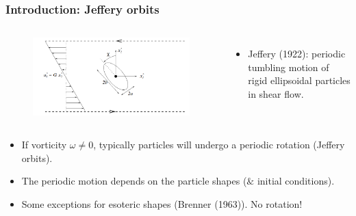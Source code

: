\documentclass{beamer}
\newcommand{\bi}{\begin{itemize}}
\newcommand{\ei}{\end{itemize}}
\begin{document}
\begin{frame}
	\frametitle{Introduction: Jeffery orbits}
	\begin{overlayarea}{\textwidth}{\textheight}
		\vspace{-0.2cm}
		\begin{columns}
			\begin{figure}[htb]
				\begin{center}
					\includegraphics[width=1\textwidth]{plots/jeffery.png}
				\end{center}
			\end{figure}
			\small
			\bi
			\item Jeffery (1922): periodic tumbling motion of rigid ellipsoidal particles in shear flow.
			\ei 
		\end{columns}
		\vspace{0.5cm}
		\bi 
		\item If vorticity $\omega\neq 0$, typically particles will undergo a periodic rotation (Jeffery orbits).
		\item The periodic motion depends on the particle shapes ($\&$ initial conditions).
		\item \alert{Some exceptions for esoteric shapes} (Brenner (1963)). No rotation!
		\ei

	\end{overlayarea}
\end{frame}

\end{document}
